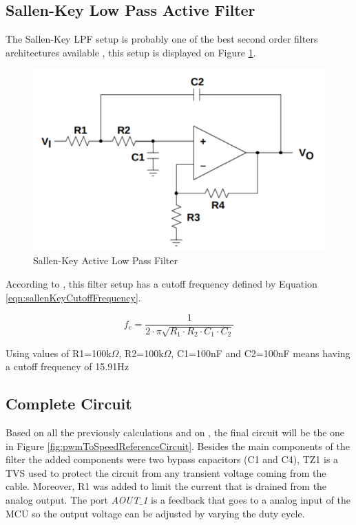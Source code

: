 	\subsection{Sallen-Key Low Pass Active Filter}\label{ssec:sallen-key-low-pass-active-filter}
	
		The Sallen-Key LPF setup is probably one of the best second order filters architectures available \cite{dorfsvodoba2014}, this setup is displayed on Figure \ref{fig:sallenKeyLPF}.

		\begin{figure}[htbp]
			\centering
			\includegraphics[width=.8\textwidth]{figuras/fig-sallenKeyLPF}
			\caption{Sallen-Key Active Low Pass Filter \cite{texas1999sallenkey}}
			\label{fig:sallenKeyLPF}
		\end{figure}

		According to \cite{texas1999sallenkey}, this filter setup has a cutoff frequency defined by Equation \ref{eqn:sallenKeyCutoffFrequency}.

		\begin{equation}\label{eqn:sallenKeyCutoffFrequency}
			f_{c}=\frac{1}{2 \cdot \pi \sqrt{R_{1} \cdot R_{2} \cdot C_{1} \cdot C_{2}}} 
		\end{equation}

		Using values of R1=100k$\Omega$, R2=100k$\Omega$, C1=100nF and C2=100nF means having a cutoff frequency of 15.91Hz

	\subsection{Complete Circuit}\label{ssec:pwm-to-speed-reference-circuit}
	
		Based on all the previously calculations and on \cite{texas1999sallenkey}, the final circuit will be the one in Figure \ref{fig:pwmToSpeedReferenceCircuit}. Besides the main components of the filter the added components were two bypass capacitors (C1 and C4), TZ1 is a TVS used to protect the circuit from any transient voltage coming from the cable. Moreover, R1 was added to limit the current that is drained from the analog output. The port \textit{AOUT$\_$1} is a feedback that goes to a analog input of the MCU so the output voltage can be adjusted by varying the duty cycle.

